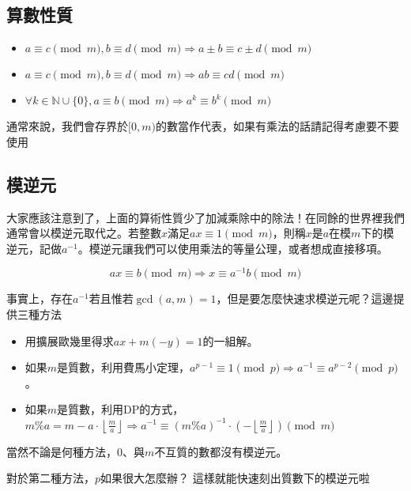 \documentclass[main.tex]{subfiles}
\begin{document}
\subsection{算數性質}
\begin{itemize}
\item $a \equiv c \pmod m, b \equiv d \pmod m \Rightarrow a \pm b \equiv c \pm d \pmod m$
\item $a \equiv c \pmod m, b \equiv d \pmod m \Rightarrow ab \equiv cd \pmod m$
\item $\forall k \in \mathbb{N} \cup \{0\}, a \equiv b \pmod m \Rightarrow a^k \equiv b^k \pmod m$
\end{itemize}
通常來說，我們會存界於$[0, m)$的數當作代表，如果有乘法的話請記得考慮要不要使用

\subsection{模逆元}
大家應該注意到了，上面的算術性質少了加減乘除中的除法！在同餘的世界裡我們通常會以模逆元取代之。若整數$x$滿足$ax \equiv 1 \pmod m$，則稱$x$是$a$在模$m$下的模逆元，記做$a^{-1}$。模逆元讓我們可以使用乘法的等量公理，或者想成直接移項。

$$
ax \equiv b \pmod m \Rightarrow x \equiv a^{-1}b \pmod m
$$

事實上，存在$a^{-1}$若且惟若$\gcd(a,m)=1$，但是要怎麼快速求模逆元呢？這邊提供三種方法
\begin{itemize}
\item 用擴展歐幾里得求$ax + m(-y) = 1$的一組解。
\item 如果$m$是質數，利用費馬小定理，$a^{p-1} \equiv 1 \pmod p \Rightarrow a^{-1} \equiv a^{p-2} \pmod p$。
\item 如果$m$是質數，利用DP的方式，\\ $m \% a = m - a \cdot \left \lfloor \frac{m}{a} \right \rfloor \Rightarrow a^{-1} \equiv (m \% a)^{-1} \cdot (- \left \lfloor \frac{m}{a} \right \rfloor) \pmod m$
\end{itemize}
當然不論是何種方法，$0$、與$m$不互質的數都沒有模逆元。

對於第二種方法，$p$如果很大怎麼辦？
這樣就能快速刻出質數下的模逆元啦
\end{document}
